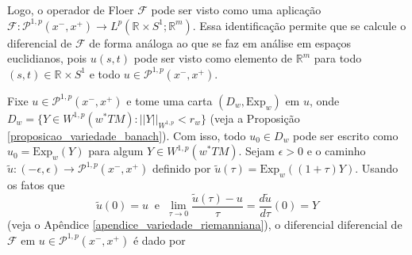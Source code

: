 \documentclass[12pt]{book}
\newcommand{\caminhosexponenciaisconectantes}[2]{\mathcal{P}^{1,p}(#1, #2)}
\newcommand{\caminhosexponenciaisconectantespadrao}{\caminhosexponenciaisconectantes{x^{-}}{x^{+}}}
\newcommand{\circulo}{S^{1}}
\newcommand{\derivada}[2]{\frac{d #1}{d #2}}
\newcommand{\espacoLpcontradominio}[2]{L^{p}(#1;#2)}
\newcommand{\espacosobolev}[1]{W^{1,p}(#1)}
\newcommand{\Exp}{\text{Exp}}
\newcommand{\operadorFloer}{\mathcal{F}}
\newcommand{\normaWp}[1]{||#1||_{W^{1,p}}}
\newcommand{\pullbackfibradotangente}[2]{#1^{*}T#2}
\newcommand{\pullbackfibradotangenteM}[1]{\pullbackfibradotangente{#1}{M}}
\newcommand{\retacartesianocirculo}{\real{} \times \circulo}
\newcommand{\real}[1]{\mathbb{R}^{#1}}
\begin{document}
	Logo, o operador de Floer $\operadorFloer$ pode ser visto como uma aplicação $\operadorFloer: \caminhosexponenciaisconectantespadrao\to \espacoLpcontradominio{\retacartesianocirculo}{\real{m}}$. Essa identificação permite que se calcule o diferencial de $\operadorFloer$ de forma análoga ao que se faz em análise em espaços euclidianos, pois $u(s,t)$ pode ser visto como elemento de $\real{m}$ para todo $(s,t)\in \retacartesianocirculo$ e todo $u\in \caminhosexponenciaisconectantespadrao$.
	
	Fixe $u \in \caminhosexponenciaisconectantespadrao$ e tome uma carta $(D_{w}, \Exp_{w})$ em $u$, onde $D_{w}=\{Y \in \espacosobolev{\pullbackfibradotangenteM{w}}: \normaWp{Y}<r_{w} \}$ (veja a Proposição \ref{proposicao_variedade_banach}). Com isso, todo $u_{0} \in D_{w}$ pode ser escrito como $u_{0}=\Exp_{w}(Y)$ para algum $Y\in \espacosobolev{\pullbackfibradotangenteM{w}}$. Sejam $\epsilon>0$ e o caminho $\tilde{u}:(-\epsilon, \epsilon)\to \caminhosexponenciaisconectantespadrao$ definido por $\tilde{u}(\tau)=\Exp_{w}((1+\tau )Y)$. Usando os fatos que 
	$$
	\tilde{u}(0) = u \;\;\text{e}\;\; \lim\limits_{\tau\to 0}\frac{\tilde{u}(\tau)-u}{\tau}=\derivada{\tilde{u}}{\tau}(0)=Y
	$$ 
	(veja o Apêndice \ref{apendice_variedade_riemanniana}), o diferencial diferencial de $\operadorFloer$ em $u \in \caminhosexponenciaisconectantespadrao$ é dado por
\end{document}
